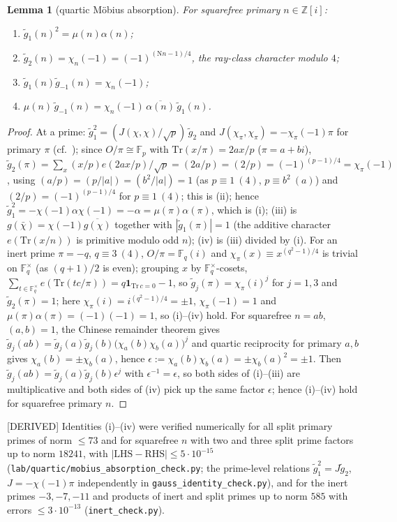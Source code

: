 \documentclass[11pt]{article}
\newtheorem{lemma}{Lemma}
\newcommand{\N}{\mathrm N}
\newcommand{\Z}{\mathbb Z}
\begin{document}
\begin{lemma}[quartic M\"obius absorption]\label{lem:abs}
For squarefree primary $n\in\Z[i]$:
\begin{enumerate}
\item[(i)] $\tilde g_1(n)^2=\mu(n)\alpha(n)$;
\item[(ii)] $\tilde g_2(n)=\chi_n(-1)=(-1)^{(\N n-1)/4}$, the ray-class character modulo $4$;
\item[(iii)] $\tilde g_1(n)\tilde g_{-1}(n)=\chi_n(-1)$;
\item[(iv)] $\mu(n)\,\tilde g_{-1}(n)=\chi_n(-1)\,\overline{\alpha(n)}\,\tilde g_1(n)$.
\end{enumerate}
\end{lemma}
\begin{proof}
At a prime: $\tilde g_1^2=(J(\chi,\chi)/\sqrt p)\,\tilde g_2$ and $J(\chi_\pi,\chi_\pi)=-\chi_\pi(-1)\pi$ for primary $\pi$ \cite[Ch.~9, Prop.~9.9.4; equivalently Prop.~9.10.1]{IR} (cf.\ \cite[(3.11)]{DDHL}); since $O/\pi\cong\mathbb F_p$ with $\mathrm{Tr}(x/\pi)=2ax/p$ ($\pi=a+bi$), $\tilde g_2(\pi)=\sum_x(x/p)e(2ax/p)/\sqrt p=(2a/p)=(2/p)=(-1)^{(p-1)/4}=\chi_\pi(-1)$, using $(a/p)=(p/|a|)=(b^2/|a|)=1$ (as $p\equiv1\ (4)$, $p\equiv b^2\ (a)$) and $(2/p)=(-1)^{(p-1)/4}$ for $p\equiv1\ (4)$; this is (ii); hence $\tilde g_1^2=-\chi(-1)\alpha\chi(-1)=-\alpha=\mu(\pi)\alpha(\pi)$, which is (i); (iii) is $g(\bar\chi)=\chi(-1)\overline{g(\chi)}$ together with $|\tilde g_1(\pi)|=1$ (the additive character $e(\mathrm{Tr}(x/n))$ is primitive modulo odd $n$); (iv) is (iii) divided by (i). For an inert prime $\pi=-q$, $q\equiv3\ (4)$, $O/\pi=\mathbb F_q(i)$ and $\chi_\pi(x)\equiv x^{(q^2-1)/4}$ is trivial on $\mathbb F_q^\times$ (as $(q+1)/2$ is even); grouping $x$ by $\mathbb F_q^\times$-cosets, $\sum_{t\in\mathbb F_q^\times}e(\mathrm{Tr}(tc/\pi))=q\mathbf 1_{\mathrm{Tr}\,c=0}-1$, so $\tilde g_j(\pi)=\chi_\pi(i)^j$ for $j=1,3$ and $\tilde g_2(\pi)=1$; here $\chi_\pi(i)=i^{(q^2-1)/4}=\pm1$, $\chi_\pi(-1)=1$ and $\mu(\pi)\alpha(\pi)=(-1)(-1)=1$, so (i)--(iv) hold. For squarefree $n=ab$, $(a,b)=1$, the Chinese remainder theorem gives $\tilde g_j(ab)=\tilde g_j(a)\tilde g_j(b)\bigl(\chi_a(b)\chi_b(a)\bigr)^j$ and quartic reciprocity for primary $a,b$ gives $\chi_a(b)=\pm\chi_b(a)$, hence $\epsilon:=\chi_a(b)\chi_b(a)=\pm\chi_b(a)^2=\pm1$. Then $\tilde g_j(ab)=\tilde g_j(a)\tilde g_j(b)\epsilon^j$ with $\epsilon^{-1}=\epsilon$, so both sides of (i)--(iii) are multiplicative and both sides of (iv) pick up the same factor $\epsilon$; hence (i)--(iv) hold for squarefree primary $n$.
\end{proof}
[DERIVED] Identities (i)--(iv) were verified numerically for all split primary primes of norm $\le73$ and for squarefree $n$ with two and three split prime factors up to norm $18241$, with $|\mathrm{LHS}-\mathrm{RHS}|\le5\cdot10^{-15}$ (\texttt{lab/quartic/mobius\_absorption\_check.py}; the prime-level relations $\tilde g_1^2=J\tilde g_2$, $J=-\chi(-1)\pi$ independently in \texttt{gauss\_identity\_check.py}), and for the inert primes $-3,-7,-11$ and products of inert and split primes up to norm $585$ with errors $\le3\cdot10^{-13}$ (\texttt{inert\_check.py}).
\end{document}
